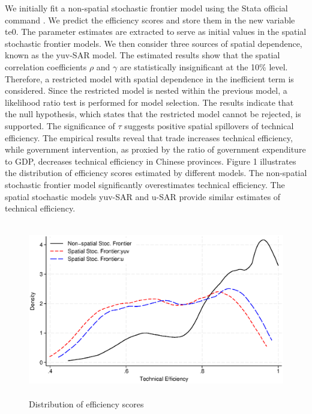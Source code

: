 We initially fit a non-spatial stochastic frontier model using the Stata official command . We predict the efficiency scores and store them in the new variable te0. The parameter estimates are extracted to serve as initial values in the spatial stochastic frontier models. We then consider three sources of spatial dependence, known as the yuv-SAR model. The estimated results show that the spatial correlation coefficients $\rho$ and $\gamma$ are statistically insignificant at the 10\% level. Therefore, a restricted model with spatial dependence in the inefficient term is considered. Since the restricted model is nested within the previous model, a likelihood ratio test is performed for model selection. The results indicate that the null hypothesis, which states that the restricted model cannot be rejected, is supported. The significance of $\tau$ suggests positive spatial spillovers of technical efficiency. The empirical results reveal that trade increases technical efficiency, while government intervention, as proxied by the ratio of government expenditure to GDP, decreases technical efficiency in Chinese provinces. Figure 1 illustrates the distribution of efficiency scores estimated by different models. The non-spatial stochastic frontier model significantly overestimates technical efficiency. The spatial stochastic models yuv-SAR and u-SAR provide similar estimates of technical efficiency.

\begin{figure}[h]
	\begin{centering}
		\includegraphics[height=3in]{fig1}
		\caption{Distribution of efficiency scores}
		\label{fig:fig1}
	\end{centering}
\end{figure}




